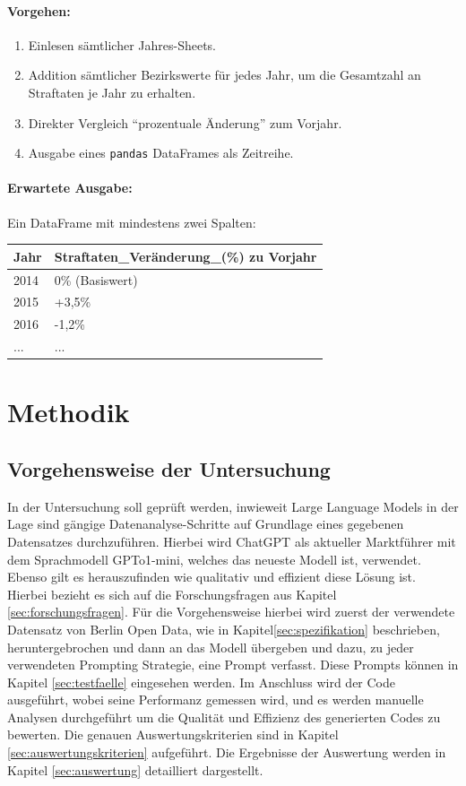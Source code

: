 \documentclass[11pt,a4paper]{article}
\begin{document}
\paragraph{Vorgehen:}
\begin{enumerate}
    \item Einlesen sämtlicher Jahres-Sheets.
    \item Addition sämtlicher Bezirkswerte für jedes Jahr, um die Gesamtzahl an Straftaten je Jahr zu erhalten.
    \item Direkter Vergleich \enquote{prozentuale Änderung} zum Vorjahr.
    \item Ausgabe eines \texttt{pandas} DataFrames als Zeitreihe.
\end{enumerate}

\paragraph{Erwartete Ausgabe:}
Ein DataFrame mit mindestens zwei Spalten:
\begin{center}
\begin{tabular}{l|l}
\textbf{Jahr} & \textbf{Straftaten\_Veränderung\_(\%) zu Vorjahr} \\
\hline
2014 & 0\% (Basiswert) \\
2015 & +3,5\% \\
2016 & -1,2\% \\
... & ...
\end{tabular}
\end{center}

\section{Methodik}
\label{sec:methodik}
\subsection{Vorgehensweise der Untersuchung}
    In der Untersuchung soll geprüft werden, inwieweit Large Language Models in der Lage sind gängige Datenanalyse-Schritte auf Grundlage eines gegebenen Datensatzes durchzuführen. Hierbei wird ChatGPT als aktueller Marktführer mit dem Sprachmodell GPTo1-mini, welches das neueste Modell ist, verwendet. Ebenso gilt es herauszufinden wie qualitativ und effizient diese Lösung ist. Hierbei bezieht es sich auf die Forschungsfragen aus Kapitel \ref{sec:forschungsfragen}.
    Für die Vorgehensweise hierbei wird zuerst der verwendete Datensatz von Berlin Open Data, wie in Kapitel\ref{sec:spezifikation} beschrieben, heruntergebrochen und dann an das Modell übergeben und dazu, zu jeder verwendeten Prompting Strategie, eine Prompt verfasst. Diese Prompts können in Kapitel \ref{sec:testfaelle} eingesehen werden.
    Im Anschluss wird der Code ausgeführt, wobei seine Performanz gemessen wird, und es werden manuelle Analysen durchgeführt um die Qualität und Effizienz des generierten Codes zu bewerten. Die genauen Auswertungskriterien sind in Kapitel \ref{sec:auswertungskriterien} aufgeführt.
    Die Ergebnisse der Auswertung werden in Kapitel \ref{sec:auswertung} detailliert dargestellt.
\end{document}
